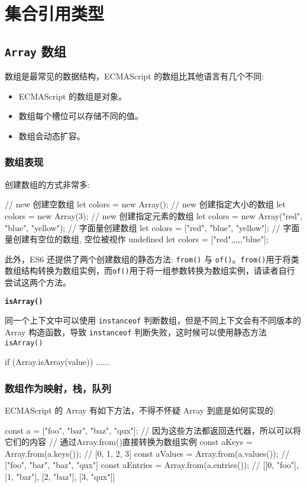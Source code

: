 \section{集合引用类型}
\subsection{\texttt{Array} 数组}

数组是最常见的数据结构，ECMAScript 的数组比其他语言有几个不同:
\begin{itemize}
    \item ECMAScript 的数组是对象。
    \item 数组每个槽位可以存储不同的值。
    \item 数组会动态扩容。
\end{itemize}

\subsubsection{数组表现}

创建数组的方式非常多:

\begin{JavaScript}
// new 创建空数组
let colors = new Array();
// new 创建指定大小的数组
let colors = new Array(3);
// new 创建指定元素的数组
let colors = new Array("red", "blue", "yellow");
// 字面量创建数组
let colors = ["red", "blue", "yellow"];
// 字面量创建有空位的数组, 空位被视作 undefined
let colors = ["red",,,,,"blue"];
\end{JavaScript}

此外，ES6 还提供了两个创建数组的静态方法: \texttt{from()} 与 \texttt{of()}。\texttt{from()}用于将类数组结构转换为数组实例，而\texttt{of()}用于将一组参数转换为数组实例，请读者自行尝试这两个方法。


\noindent\textbf{\texttt{isArray()}} 

同一个上下文中可以使用 \texttt{instanceof} 判断数组，但是不同上下文会有不同版本的 Array 构造函数，导致 \texttt{instanceof} 判断失败，这时候可以使用静态方法 \texttt{isArray()}

\begin{JavaScript}
if (Array.isArray(value)) {
    ......
}
\end{JavaScript}

\subsubsection{数组作为映射，栈，队列}

ECMAScript 的 Array 有如下方法，不得不怀疑 Array 到底是如何实现的:
\begin{JavaScript}
const a = ["foo", "bar", "baz", "qux"]; // 因为这些方法都返回迭代器，所以可以将它们的内容
// 通过Array.from()直接转换为数组实例
const aKeys = Array.from(a.keys());         // [0, 1, 2, 3]
const aValues = Array.from(a.values());     // ["foo", "bar", "baz", "qux"]
const aEntries = Array.from(a.entries());   // [[0, "foo"], [1, "bar"], [2, "baz"], [3, "qux"]] 
\end{JavaScript}

